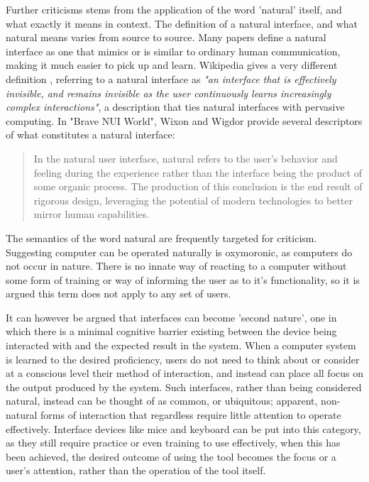 Further criticisms stems from the application of the word 'natural' itself, and what exactly it means in context. The definition of a natural interface, and what natural means varies from source to source. Many papers  define a natural interface as one that mimics or is similar to ordinary human communication, making it much easier to pick up and learn. Wikipedia gives a very different definition , referring to a natural interface as \emph{"an interface that is effectively invisible, and remains invisible as the user continuously learns increasingly complex interactions"}, a description that ties natural interfaces with pervasive computing. In "Brave NUI World", Wixon and Wigdor provide several descriptors of what constitutes a natural interface:

\begin{quote}

In the natural user interface, natural refers to the user's behavior and feeling during the experience rather than the interface being the product of some organic process. The production of this conclusion is the end result of rigorous design, leveraging the potential of modern technologies to better mirror human capabilities.

\end{quote}

The semantics of the word natural are frequently targeted for criticism. Suggesting computer can be operated naturally is oxymoronic, as computers do not occur in nature. There is no innate way of reacting to a computer without some form of training or way of informing the user as to it's functionality, so it is argued this term does not apply to any set of users.

It can however be argued that interfaces can become 'second nature', one in which there is a minimal cognitive barrier existing between the device being interacted with and the expected result in the system. When a computer system is learned to the desired proficiency, users do not need to think about or consider at a conscious level their method of interaction, and instead can place all focus on the output produced by the system. Such interfaces, rather than being considered natural, instead can be thought of as common, or ubiquitous; apparent, non-natural forms of interaction that regardless require little attention to operate effectively. Interface devices like mice and keyboard can be put into this category, as they still require practice or even training to use effectively, when this has been achieved, the desired outcome of using the tool becomes the focus or a user's attention, rather than the operation of the tool itself.

